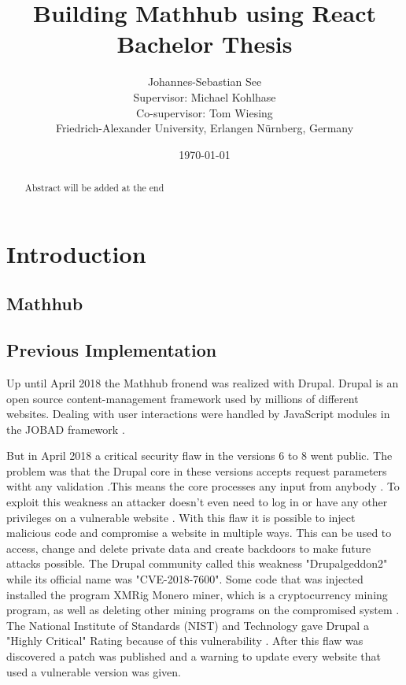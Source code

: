 \documentclass[11pt,a4paper]{article}
\title{Building Mathhub using React\\ \vspace{2 mm} Bachelor Thesis}
\author{Johannes-Sebastian See\\Supervisor: Michael Kohlhase\\Co-supervisor: Tom Wiesing\\Friedrich-Alexander University, Erlangen Nürnberg, Germany}
\date{\today}
\begin{document}
\begin{titlepage}
\maketitle
\begin{abstract}
Abstract will be added at the end
\end{abstract}

\end{titlepage}

\tableofcontents
\section{Introduction}
	\subsection{Mathhub}
	\subsection{Previous Implementation}
	Up until April 2018 the Mathhub fronend was realized with Drupal. Drupal is an open source content-management framework used by millions of different websites.
Dealing with user interactions were handled by JavaScript modules in the JOBAD framework \cite{comp}.
	
But in April 2018 a critical security flaw in the versions 6 to 8 went public. The problem was that the Drupal core in these versions accepts request parameters witht any validation .This means the core processes any input from anybody \cite{zdnet}.
To exploit this weakness an attacker doesn't even need to log in or have any other privileges on a vulnerable website \cite{register}.
With this flaw it is possible to inject malicious code and compromise a website in multiple ways. This can be used to access, change and delete private data and create backdoors to make future attacks possible. The Drupal community called this weakness "Drupalgeddon2" while its official name was "CVE-2018-7600". Some code that was injected installed the program XMRig Monero miner, which is a cryptocurrency mining program, as well as deleting other mining programs on the compromised system \cite{hacker}.
The National Institute of Standards (NIST) and Technology gave Drupal a "Highly Critical" Rating because of this vulnerability \cite{nist}.
 After this flaw was discovered a patch was published and a warning to update every website that used a vulnerable version was given.
	
\end{document}
